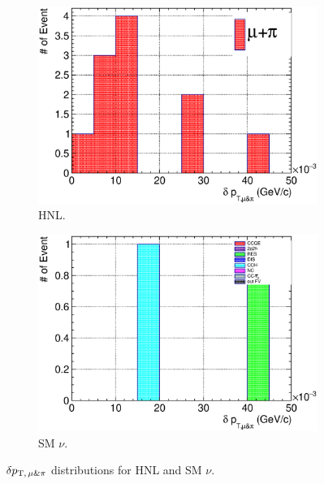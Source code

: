         \begin{figure}[!htb]
           \centering
           \begin{subfigure}{0.45\textwidth}
                \includegraphics[width=\textwidth]{figures/hnl/hnl_sfgmu_mpdpt_stack_al9_300_aftmupikin.eps}
                \caption{HNL.}
                \label{fig:hnl-mupidpt}
           \end{subfigure}
           \begin{subfigure}{0.45\textwidth}
                \includegraphics[width=\textwidth]{figures/hnl/hnl_sfgmu_mpdpt_stack_al9_SM_aftmupikin.eps}
                \caption{SM $\nu$.}
                \label{fig:sm-mupidpt}
           \end{subfigure}
           \caption{$\delta p_{\textrm{T},\,\mu\&\pi}$ distributions for HNL and SM $\nu$.}
           \label{fig:mmupi-dpt}
        \end{figure}

